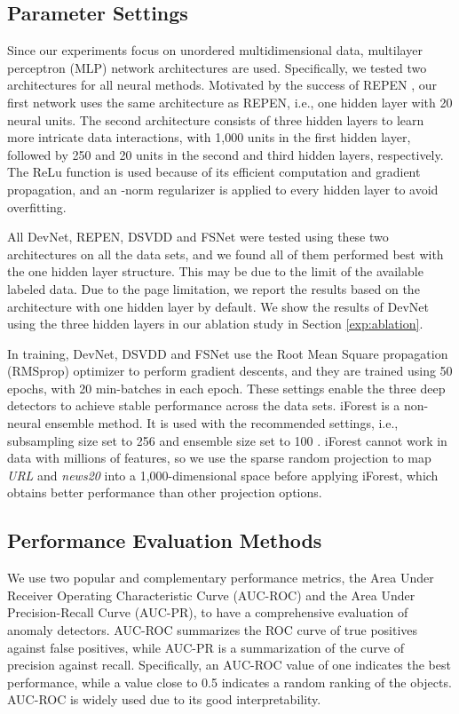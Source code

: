 \documentclass[sigconf]{acmart}
\begin{document}
\subsection{Parameter Settings}\label{sec:parameter}
Since our experiments focus on unordered multidimensional data, multilayer perceptron (MLP) network architectures are used. Specifically, we tested two architectures for all neural methods. Motivated by the success of REPEN \cite{pang2018repen}, our first network uses the same architecture as REPEN, i.e., one hidden layer with 20 neural units. The second architecture consists of three hidden layers to learn more intricate data interactions, with 1,000 units in the first hidden layer, followed by 250 and 20 units in the second and third hidden layers, respectively. The ReLu function  is used because of its efficient computation and gradient propagation, and an -norm regularizer is applied to every hidden layer to avoid overfitting.

All DevNet, REPEN, DSVDD and FSNet were tested using these two architectures on all the data sets, and we found all of them performed best with the one hidden layer structure. This may be due to the limit of the available labeled data. Due to the page limitation, we report the results based on the architecture with one hidden layer by default. We show the results of DevNet using the three hidden layers in our ablation study in Section \ref{exp:ablation}.





In training, DevNet, DSVDD and FSNet use the Root Mean Square propagation (RMSprop) optimizer \cite{hinton2012rmsprop} to perform gradient descents, and they are trained using 50 epochs, with 20 min-batches in each epoch. These settings enable the three deep detectors to achieve stable performance across the data sets. iForest is a non-neural ensemble method. It is used with the recommended settings, i.e., subsampling size set to 256 and ensemble size set to 100  \cite{liu2012iforest}. iForest cannot work in data with millions of features, so we use the sparse random projection \cite{li2006srp} to map \textit{URL} and \textit{news20} into a 1,000-dimensional space before applying iForest, which obtains better performance than other projection options.

\subsection{Performance Evaluation Methods}
We use two popular and complementary performance metrics, the Area Under Receiver Operating Characteristic Curve (AUC-ROC) and the Area Under Precision-Recall Curve (AUC-PR), to have a comprehensive evaluation of anomaly detectors. AUC-ROC summarizes the ROC curve of true positives against false positives, while AUC-PR is a summarization of the curve of precision against recall. Specifically, an AUC-ROC value of one indicates the best performance, while a value close to 0.5 indicates a random ranking of the objects. AUC-ROC is widely used due to its good interpretability. 
\end{document}
